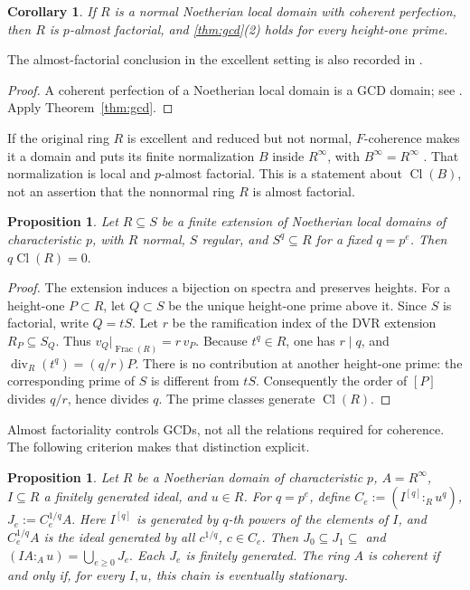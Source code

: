 \documentclass[11pt,a4paper]{amsart}
\numberwithin{equation}{section}
\newtheorem{proposition}[theorem]{Proposition}
\newtheorem{corollary}[theorem]{Corollary}
\newcommand{\Cl}{\operatorname{Cl}}
\newcommand{\divisor}{\operatorname{div}}
\newcommand{\Frac}{\operatorname{Frac}}
\begin{document}
 \begin{corollary}\label{cor:coh}
 If $R$ is a normal Noetherian local domain with coherent perfection,
then $R$ is $p$-almost factorial, and \ref{thm:gcd}(2) holds for every
height-one prime.
 \end{corollary}The almost-factorial conclusion in the excellent setting is also
 recorded in \cite[Remark~4.9]{Pat}.
 \begin{proof}
A coherent perfection of a Noetherian local domain is a GCD 	domain; see \cite[Corollary 3.7]{moh}. Apply Theorem~\ref{thm:gcd}.
 \end{proof}
 
 If the original ring $R$ is excellent and reduced but not normal,
 $F$-coherence makes it a domain and puts its finite normalization
 $B$ inside $R^\infty$, with $B^\infty=R^\infty$
 \cite[Section~3]{Shim}. That normalization is local and
 $p$-almost factorial. This is a statement about $\Cl(B)$, not
 an assertion that the nonnormal ring $R$ is almost factorial.

 
 \begin{proposition}\label{prop:uniform}
  Let $R\subseteq S$ be a finite extension of Noetherian local
 domains of characteristic $p$, with $R$ normal, $S$ regular,
 and $S^q\subseteq R$ for a fixed $q=p^e$. Then
$	q\Cl(R)=0. $
 \end{proposition}
 \begin{proof}
 The extension induces a bijection on spectra and preserves heights.
 For a height-one $P\subset R$, let $Q\subset S$ be the unique
 height-one prime above it.
Since $S$ is factorial, write $Q=tS$.
Let $r$ be the ramification index of the DVR extension
$R_P\subseteq S_Q$. Thus
$v_Q|_{\Frac(R)}=r\,v_P$.
Because $t^q\in R$, one has $r\mid q$, and
$	\divisor_R(t^q)=(q/r)P. $	There is no contribution at another height-one prime:
the corresponding prime of $S$ is different from $tS$.
 Consequently the order of $[P]$ divides $q/r$, hence divides $q$.
 The prime classes generate $\Cl(R)$.
 \end{proof}
 
 
 
 
 
 Almost factoriality controls GCDs, not all the relations required
 for coherence. The following criterion makes that distinction
 explicit.
 
 \begin{proposition}\label{prop:colon}
 Let $R$ be a Noetherian domain of characteristic $p$,
$A=R^\infty$, $I\subseteq R$ a finitely generated ideal,
and $u\in R$.
For $q=p^e$, define
$ 	C_e:=(I^{[q]}:_R u^q)$, $J_e:=C_e^{1/q}A. $
Here $I^{[q]}$ is generated by $q$-th powers of the elements
of $I$, and $C_e^{1/q}A$ is the ideal generated by all
$c^{1/q}$, $c\in C_e$. Then
$J_0\subseteq J_1\subseteq$ and
$	(IA:_A u)=\bigcup_{e\geq0}J_e.$
Each $J_e$ is finitely generated.
The ring $A$ is coherent if and only if, for every $I,u$,
this chain is eventually stationary.
 \end{proposition}
 
\end{document}
